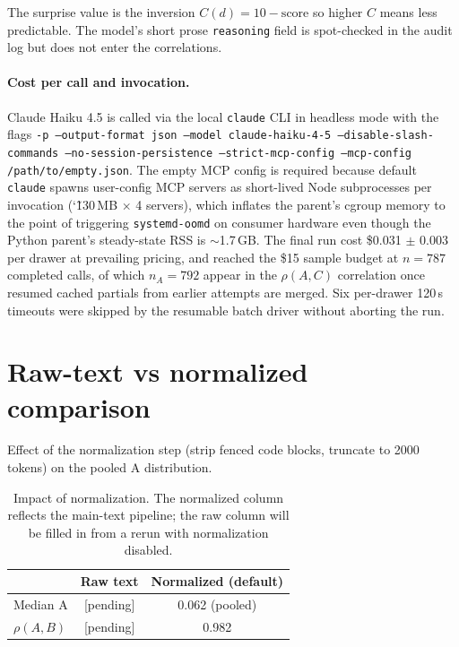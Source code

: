 The surprise value is the inversion $C(d) = 10 - \mathrm{score}$
so higher $C$ means less predictable. The model's short prose
\texttt{reasoning} field is spot-checked in the audit log but does not
enter the correlations.

\paragraph{Cost per call and invocation.}
Claude Haiku 4.5 is called via the local \texttt{claude} CLI in
headless mode with the flags
\texttt{-p --output-format json --model claude-haiku-4-5\
--disable-slash-commands --no-session-persistence\
--strict-mcp-config --mcp-config /path/to/empty.json}. The empty MCP
config is required because default \texttt{claude} spawns user-config
MCP servers as short-lived Node subprocesses per invocation
(\char`\~ 130\,MB $\times$ 4 servers), which inflates the parent's
cgroup memory to the point of triggering \texttt{systemd-oomd} on
consumer hardware even though the Python parent's steady-state RSS is
$\sim$1.7\,GB. The final run cost \$0.031 $\pm$ 0.003 per drawer at
prevailing pricing, and reached the \$15 sample budget at $n = 787$
completed calls, of which $n_A = 792$ appear in the $\rho(A,C)$
correlation once resumed cached partials from earlier attempts are
merged. Six per-drawer 120\,s timeouts were skipped by the resumable
batch driver without aborting the run.

\section{Raw-text vs normalized comparison}
Effect of the normalization step (strip fenced code blocks, truncate to
2000 tokens) on the pooled A distribution.

\begin{table}[h]
\centering
\begin{tabular}{lcc}
\toprule
 & Raw text & Normalized (default) \\
\midrule
Median A       & [pending] & 0.062 (pooled) \\
$\rho(A, B)$   & [pending] & 0.982 \\
\bottomrule
\end{tabular}
\caption{Impact of normalization. The normalized column reflects the
main-text pipeline; the raw column will be filled in from a rerun with
normalization disabled.}
\end{table}
